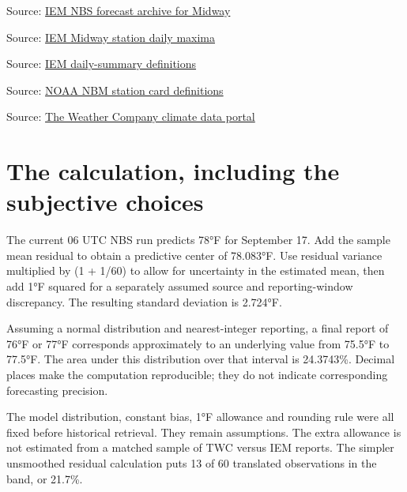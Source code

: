 \documentclass[11pt]{article}
\begin{document}
\par{\small Source: \href{https://mesonet.agron.iastate.edu/cgi-bin/request/mos.py?station=KMDW\&model=NBS\&sts=2026-07-17T00\%3A00Z\&ets=2026-09-15T00\%3A00Z\&format=csv}{IEM NBS forecast archive for Midway}}
\par{\small Source: \href{https://mesonet.agron.iastate.edu/cgi-bin/request/daily.py?sts=2026-07-18\&ets=2026-09-15\&network=IL\_ASOS\&stations=MDW\&var=max\_temp\_f\&format=csv}{IEM Midway station daily maxima}}
\par{\small Source: \href{https://mesonet.agron.iastate.edu/cgi-bin/request/daily.py?help=}{IEM daily-summary definitions}}
\par{\small Source: \href{https://vlab.noaa.gov/web/mdl/nbm-textcard-v5.0}{NOAA NBM station card definitions}}
\par{\small Source: \href{https://weather.com/kalshi}{The Weather Company climate data portal}}
\section*{\textcolor{epdarkgreen}{The calculation, including the subjective choices}}
The current 06 UTC NBS run predicts 78°F for September 17. Add the sample mean residual to obtain a predictive center of 78.083°F. Use residual variance multiplied by (1 + 1/60) to allow for uncertainty in the estimated mean, then add 1°F squared for a separately assumed source and reporting-window discrepancy. The resulting standard deviation is 2.724°F.


Assuming a normal distribution and nearest-integer reporting, a final report of 76°F or 77°F corresponds approximately to an underlying value from 75.5°F to 77.5°F. The area under this distribution over that interval is 24.3743\%. Decimal places make the computation reproducible; they do not indicate corresponding forecasting precision.


The model distribution, constant bias, 1°F allowance and rounding rule were all fixed before historical retrieval. They remain assumptions. The extra allowance is not estimated from a matched sample of TWC versus IEM reports. The simpler unsmoothed residual calculation puts 13 of 60 translated observations in the band, or 21.7\%.
\end{document}
